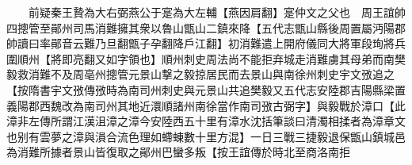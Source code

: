 　　前疑秦王贄為大右弼燕公于寔為大左輔【燕因肩翻】寔仲文之父也　周王誼帥四摠管至鄖州司馬消難擁其衆以魯山甑山二鎮來降【五代志甑山縣後周置屬沔陽郡帥讀曰率鄖音云難乃旦翻甑子孕翻降戶江翻】初消難遣上開府儀同大將軍段珣將兵圍順州【將即亮翻又如字領也】順州刺史周法尚不能拒弃城走消難虜其母弟而南樊毅救消難不及周亳州摠管元景山撃之毅掠居民而去景山與南徐州刺史宇文㢸追之【按隋書宇文㢸傳㢸時為南司州刺史與元景山共追樊毅又五代志安陸郡吉陽縣梁置義陽郡西魏改為南司州其地近澴順諸州南徐當作南司㢸古弼字】與毅戰於漳口【此漳非左傳所謂江漢沮漳之漳今安陸西五十里有漳水沈括筆談曰清濁相揉者為漳章文也别有雲夢之漳與溳合流色理如螮蝀數十里方混】一日三戰三捷毅退保甑山鎮城邑為消難所據者景山皆復取之鄖州巴蠻多叛【按王誼傳於時北至商洛南拒